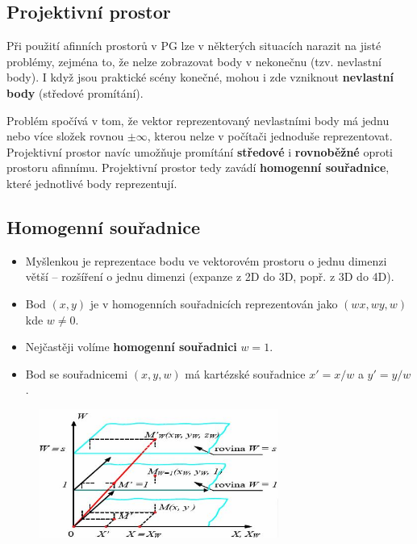\subsection{Projektivní prostor}
Při použití afinních prostorů v PG lze v některých situacích narazit na jisté problémy, zejména to, že nelze zobrazovat body v nekonečnu (tzv. nevlastní body). I když jsou praktické scény konečné, mohou i zde vzniknout \textbf{nevlastní body} (středové promítání). 

Problém spočívá v tom, že vektor reprezentovaný nevlastními body má jednu nebo více složek rovnou $\pm \infty$, kterou nelze v počítači jednoduše reprezentovat. Projektivní prostor navíc umožňuje promítání \textbf{středové} i \textbf{rovnoběžné} oproti prostoru afinnímu. Projektivní prostor tedy zavádí \textbf{homogenní souřadnice}, které jednotlivé body reprezentují.

\subsection{Homogenní souřadnice}
\begin{itemize}
	\item Myšlenkou je reprezentace bodu ve vektorovém prostoru o jednu dimenzi větší -- rozšíření o jednu dimenzi (expanze z 2D do 3D, popř. z 3D do 4D).
	\item Bod $(x,y)$ je v homogenních souřadnicích reprezentován jako $(wx,wy,w)$ kde $w \not= 0$.
	\item Nejčastěji volíme \textbf{homogenní souřadnici} $w = 1$.
	\item Bod se souřadnicemi $(x, y, w)$ má kartézské souřadnice $x' = x/w$ a $y' = y/w$. 
\end{itemize}
\begin{figure}[H]
\centering
\includegraphics[width=0.7\textwidth]{assets/2_homoprostor}
\end{figure}

